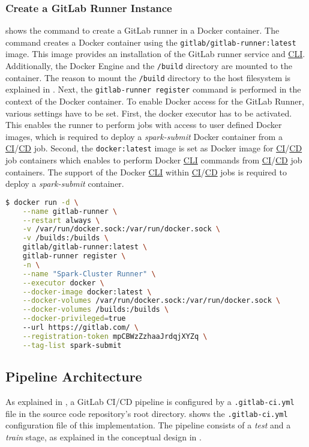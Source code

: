 \subsubsection{Create a GitLab Runner Instance}
 shows the command to create a GitLab runner in a Docker container.
The command creates a Docker container using the \texttt{gitlab/gitlab-runner:latest} image. This image provides an installation of the GitLab runner service and \hyperlink{abbr:cli}{CLI}. Additionally, the Docker Engine and the \texttt{/build} directory are mounted to the container. The reason to mount the \texttt{/build} directory to the host filesystem is explained in .
Next, the \texttt{gitlab-runner register} command is performed in the context of the Docker container.
To enable Docker access for the GitLab Runner, various settings have to be set. First, the docker executor has to be activated. This enables the runner to perform jobs with access to user defined Docker images, which is required to deploy a \textit{spark-submit} Docker container from a \hyperlink{abbr:ci}{CI}/\hyperlink{abbr:cd}{CD} job. Second, the \texttt{docker:latest} image is set as Docker image for \hyperlink{abbr:ci}{CI}/\hyperlink{abbr:cd}{CD} job containers which enables to perform Docker \hyperlink{abbr:cli}{CLI} commands from \hyperlink{abbr:ci}{CI}/\hyperlink{abbr:cd}{CD} job containers.
%
The support of the Docker \hyperlink{abbr:cli}{CLI} within \hyperlink{abbr:ci}{CI}/\hyperlink{abbr:cd}{CD} jobs is required to deploy a \textit{spark-submit} container.
\newpage
\begin{lstlisting}[label=lst:06_ci_runner_container_cmd, caption=CLI command to start a GitLab runner in a Docker container, language=bash, numbers=none]
$ docker run -d \
    --name gitlab-runner \
    --restart always \
    -v /var/run/docker.sock:/var/run/docker.sock \
    -v /builds:/builds \
    gitlab/gitlab-runner:latest \
    gitlab-runner register \
    -n \
    --name "Spark-Cluster Runner" \
    --executor docker \
    --docker-image docker:latest \
    --docker-volumes /var/run/docker.sock:/var/run/docker.sock \
    --docker-volumes /builds:/builds \
    --docker-privileged=true
    --url https://gitlab.com/ \
    --registration-token mpCBWzZzhaaJrdqjXYZq \
    --tag-list spark-submit
\end{lstlisting}


\subsection{Pipeline Architecture}
%
As explained in , a GitLab CI/CD pipeline is configured by a \texttt{.gitlab-ci.yml} file in the source code repository's root directory.
%
 shows the \texttt{.gitlab-ci.yml}  configuration file of this implementation. The pipeline consists of a \textit{test} and a \textit{train} stage, as explained in the conceptual design in .


